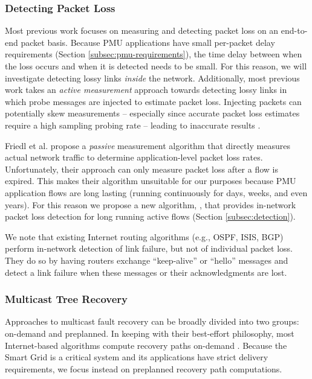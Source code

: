 \subsubsection{Detecting Packet Loss} 

Most previous work \cite{Almes99,Caceres99,Friedl09} focuses on measuring and detecting packet loss on an end-to-end packet basis.
Because PMU applications have small per-packet delay requirements (Section \ref{subsec:pmu-requirements}), the time delay between when the loss occurs and when it is detected needs to be small.  
For this reason, we will investigate detecting lossy links \emph{inside} the network. 
Additionally, most previous work takes an \emph{active measurement} approach towards detecting lossy links in which probe messages are injected to estimate packet loss.  Injecting packets can
potentially skew measurements -- especially since accurate packet loss estimates require a high sampling probing rate -- leading to inaccurate results \cite{Barford04}. 


Friedl et al. \cite{Friedl09} propose a \emph{passive} measurement algorithm that directly measures actual network traffic to determine application-level packet loss rates. 
Unfortunately, their approach can only measure packet loss after a flow is expired.  This makes their algorithm unsuitable for our purposes because
PMU application flows are long lasting (running continuously for days, weeks, and even years). 
For this reason we propose a new algorithm, \fls, that provides in-network packet loss detection for long running active flows (Section \ref{subsec:detection}).

We note that existing Internet routing algorithms (e.g., OSPF, ISIS, BGP) perform in-network detection of link failure, but not of individual packet loss. They do so by
having routers exchange ``keep-alive'' or ``hello'' messages and detect a link failure when these messages or their acknowledgments are lost.




\subsubsection{Multicast Tree Recovery}

Approaches to multicast fault recovery can be broadly divided into two groups: on-demand and preplanned. 
In keeping with their best-effort philosophy, most Internet-based algorithms compute recovery paths on-demand \cite{Cui04}. 
Because the Smart Grid is a critical system and its applications have strict delivery requirements, we focus instead on preplanned recovery path computations.
 
